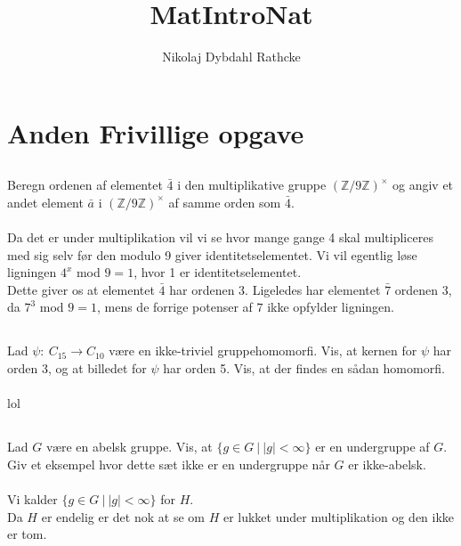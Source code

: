 \documentclass[12pt]{article}
\title{MatIntroNat}
\author{Nikolaj Dybdahl Rathcke}
\begin{document}
\section{Anden Frivillige opgave}

\subsection{}
Beregn ordenen af elementet $\bar{4}$ i den multiplikative gruppe $(\mathbb{Z}/9\mathbb{Z})^{\times}$ og angiv et andet element $\bar{a}$ i $(\mathbb{Z}/9\mathbb{Z})^{\times}$ af samme orden som $\bar{4}$.\\
\\
Da det er under multiplikation vil vi se hvor mange gange 4 skal multipliceres med sig selv før den modulo 9 giver identitetselementet. Vi vil egentlig løse ligningen $4^x$ mod $9 = 1$, hvor 1 er identitetselementet.\\
Dette giver os at elementet $\bar{4}$ har ordenen 3.
Ligeledes har elementet $\bar{7}$ ordenen 3, da $7^3$ mod $9 = 1$, mens de forrige potenser af $7$ ikke opfylder ligningen.

\subsection{}
Lad $\psi:\:C_{15}\rightarrow C_{10}$ være en ikke-triviel gruppehomomorfi. Vis, at kernen for $\psi$ har orden $3$, og at billedet for $\psi$ har orden 5. Vis, at der findes en sådan homomorfi.\\
\\
lol

\subsection{}
Lad $G$ være en abelsk gruppe. Vis, at $\{g \in G\:|\:|g|<\infty\}$ er en undergruppe af $G$. Giv et eksempel hvor dette sæt ikke er en undergruppe når $G$ er ikke-abelsk.\\
\\
Vi kalder $\{g \in G\:|\:|g|<\infty\}$ for $H$.\\
Da $H$ er endelig er det nok at se om $H$ er lukket under multiplikation og den ikke er tom.
\end{document}

